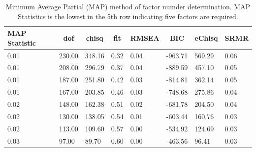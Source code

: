 \documentclass[
  english,
  man]{apa6}
\begin{document}
\begin{table}[tbp]

\begin{center}
\begin{threeparttable}

\caption{\label{tab:map-tab}Minimum Average Partial (MAP) method of factor numder determination. MAP Statistics is the lowest in the 5th row indicating five factors are required.}

\begin{tabular}{llllllll}
\toprule
MAP Statistic & \multicolumn{1}{c}{dof} & \multicolumn{1}{c}{chisq} & \multicolumn{1}{c}{fit} & \multicolumn{1}{c}{RMSEA} & \multicolumn{1}{c}{BIC} & \multicolumn{1}{c}{eChisq} & \multicolumn{1}{c}{SRMR}\\
\midrule
0.01 & 230.00 & 348.16 & 0.32 & 0.04 & -963.71 & 569.29 & 0.06\\
0.01 & 208.00 & 296.79 & 0.37 & 0.04 & -889.59 & 457.10 & 0.05\\
0.01 & 187.00 & 251.80 & 0.42 & 0.03 & -814.81 & 362.14 & 0.05\\
0.01 & 167.00 & 203.85 & 0.46 & 0.03 & -748.68 & 275.86 & 0.04\\
0.02 & 148.00 & 162.38 & 0.51 & 0.02 & -681.78 & 204.50 & 0.04\\
0.02 & 130.00 & 138.05 & 0.54 & 0.01 & -603.44 & 160.76 & 0.03\\
0.02 & 113.00 & 109.60 & 0.57 & 0.00 & -534.92 & 124.69 & 0.03\\
0.03 & 97.00 & 89.70 & 0.60 & 0.00 & -463.56 & 96.41 & 0.03\\
\bottomrule
\end{tabular}

\end{threeparttable}
\end{center}

\end{table}
\end{document}

